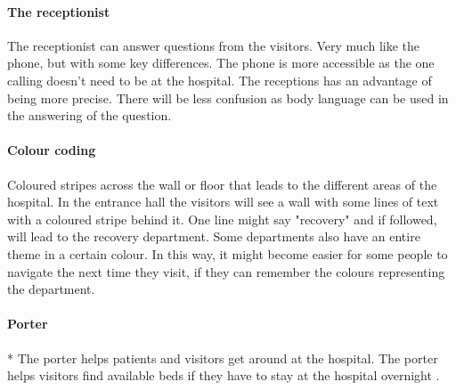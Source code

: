 \paragraph{The receptionist}

The receptionist can answer questions from the visitors. Very much like the phone, but with some key differences. The phone is more accessible as the one calling doesn't need to be at the hospital. The receptions has an advantage of being more precise. There will be less confusion as body language can be used in the answering of the question.

\paragraph{Colour coding}
Coloured stripes across the wall or floor that leads to the different areas of the hospital. In the entrance hall the visitors will see a wall with some lines of text with a coloured stripe behind it. One line might say "recovery" and if followed, will lead to the recovery department. Some departments also have an entire theme in a certain colour. In this way, it might become easier for some people to navigate the next time they visit, if they can remember the colours representing the department. 

\paragraph{Porter}*
The porter helps patients and visitors get around at the hospital. The porter helps visitors find available beds if they have to stay at the hospital overnight \cite{ugd_port}. 

